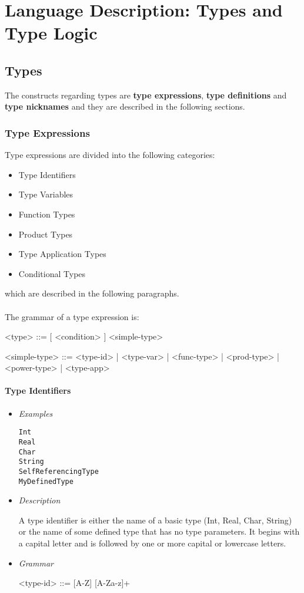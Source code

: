\documentclass{article}
\begin{document}
\section{Language Description: Types and Type Logic}

\subsection{Types}
\label{subsec:types}

The constructs regarding types are \textbf{type expressions}, \textbf{type
definitions} and \textbf{type nicknames} and they are described in the
following sections.

\subsubsection{Type Expressions}

Type expressions are divided into the following categories:
\begin{itemize}
\item Type Identifiers
\item Type Variables
\item Function Types
\item Product Types
\item Type Application Types
\item Conditional Types
\end{itemize}
which are described in the following paragraphs.
\\\\
The grammar of a type expression is:
\begin{grammar}
<type> ::= [ <condition> ]  <simple-type> 

<simple-type> ::=
<type-id> | <type-var> | <func-type> | <prod-type> | <power-type> | <type-app>
\\
\end{grammar}
\paragraph{Type Identifiers}

\begin{itemize}
\item \textit{Examples}
\begin{verbatim}
Int
Real 
Char 
String
SelfReferencingType
MyDefinedType
\end{verbatim}

\item \textit{Description}

A type identifier is either the name of a basic type (Int, Real, Char, String) or
the name of some defined type that has no type parameters. It begins with a capital
letter and is followed by one or more capital or lowercase letters.

\item \textit{Grammar}
\begin{grammar}
<type-id> ::= [A-Z] [A-Za-z]+ \\ 
\end{grammar}
\end{itemize}
\end{document}
